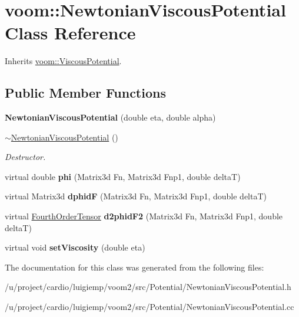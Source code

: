 \hypertarget{classvoom_1_1_newtonian_viscous_potential}{
\section{voom::NewtonianViscousPotential Class Reference}
\label{classvoom_1_1_newtonian_viscous_potential}
}


Inherits \hyperlink{classvoom_1_1_viscous_potential}{voom::ViscousPotential}.\subsection*{Public Member Functions}
\begin{DoxyCompactItemize}
\item 
\hypertarget{classvoom_1_1_newtonian_viscous_potential_a78a6d03c8794a1b116725965e7533d5b}{
{\bfseries NewtonianViscousPotential} (double eta, double alpha)}
\label{classvoom_1_1_newtonian_viscous_potential_a78a6d03c8794a1b116725965e7533d5b}

\item 
\hypertarget{classvoom_1_1_newtonian_viscous_potential_a2fb03f5d708e62381bdf03fa473c538c}{
\hyperlink{classvoom_1_1_newtonian_viscous_potential_a2fb03f5d708e62381bdf03fa473c538c}{$\sim$NewtonianViscousPotential} ()}
\label{classvoom_1_1_newtonian_viscous_potential_a2fb03f5d708e62381bdf03fa473c538c}

\begin{DoxyCompactList}\small\item\em Destructor. \item\end{DoxyCompactList}\item 
\hypertarget{classvoom_1_1_newtonian_viscous_potential_a8d186823bbaf0d0316c720a90ee0a0ad}{
virtual double {\bfseries phi} (Matrix3d Fn, Matrix3d Fnp1, double deltaT)}
\label{classvoom_1_1_newtonian_viscous_potential_a8d186823bbaf0d0316c720a90ee0a0ad}

\item 
\hypertarget{classvoom_1_1_newtonian_viscous_potential_a74fd6851294285ba2cf8b5a2606c186d}{
virtual Matrix3d {\bfseries dphidF} (Matrix3d Fn, Matrix3d Fnp1, double deltaT)}
\label{classvoom_1_1_newtonian_viscous_potential_a74fd6851294285ba2cf8b5a2606c186d}

\item 
\hypertarget{classvoom_1_1_newtonian_viscous_potential_adab00a025ab17aceb1da25e31718b6f0}{
virtual \hyperlink{classvoom_1_1_fourth_order_tensor}{FourthOrderTensor} {\bfseries d2phidF2} (Matrix3d Fn, Matrix3d Fnp1, double deltaT)}
\label{classvoom_1_1_newtonian_viscous_potential_adab00a025ab17aceb1da25e31718b6f0}

\item 
\hypertarget{classvoom_1_1_newtonian_viscous_potential_a5a33f4804cccf3de1bd37198df656544}{
virtual void {\bfseries setViscosity} (double eta)}
\label{classvoom_1_1_newtonian_viscous_potential_a5a33f4804cccf3de1bd37198df656544}

\end{DoxyCompactItemize}


The documentation for this class was generated from the following files:\begin{DoxyCompactItemize}
\item 
/u/project/cardio/luigiemp/voom2/src/Potential/NewtonianViscousPotential.h\item 
/u/project/cardio/luigiemp/voom2/src/Potential/NewtonianViscousPotential.cc\end{DoxyCompactItemize}
